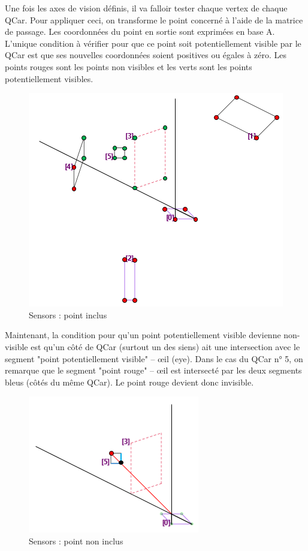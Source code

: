 \documentclass[a4paper, 12pt]{article}
\begin{document}
Une fois les axes de vision définis, il va falloir tester chaque vertex de chaque QCar. Pour appliquer ceci, on transforme le point concerné à l'aide de la matrice de passage. Les coordonnées du point en sortie sont exprimées en base A. L'unique condition à vérifier pour que ce point soit potentiellement visible par le QCar est que ses nouvelles coordonnées soient positives ou égales à zéro.
Les points rouges sont les points non visibles et les verts sont les points potentiellement visibles.
\begin{figure}[H]
\centering
\includegraphics[width=0.7\linewidth]{includes/images/sensors/3_pointsInclusion}
\caption{Sensors : point inclus}
\label{fig:3pointsinclusion}
\end{figure}
Maintenant, la condition pour qu'un point potentiellement visible devienne non-visible est qu'un côté de QCar (surtout un des siens) ait une intersection avec le segment "point potentiellement visible" – œil (eye).
Dans le cas du QCar n° 5, on remarque que le segment "point rouge" – œil est intersecté par les deux segments bleus (côtés du même QCar). Le point rouge devient donc invisible.
\begin{figure}[H]
\centering
\includegraphics[width=0.5\linewidth]{includes/images/sensors/4_nonIncludedPoint}
\caption{Sensors : point non inclus}
\label{fig:4nonincludedpoint}
\end{figure}
\end{document}

